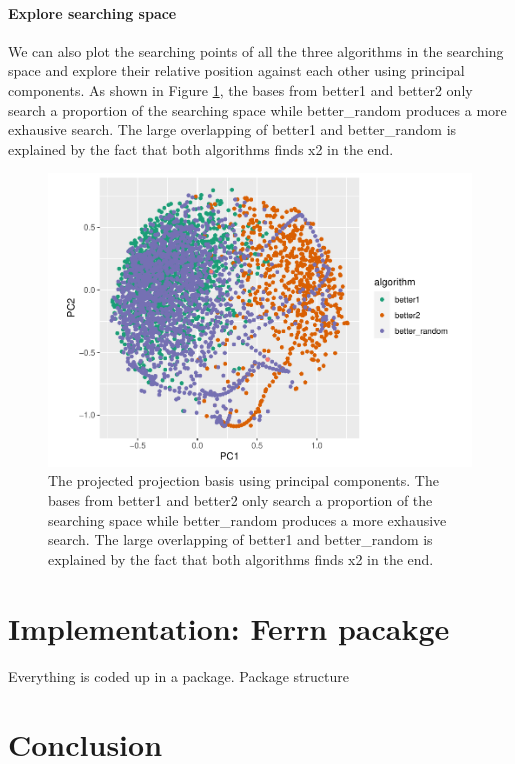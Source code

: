 \documentclass[12pt]{article}
\begin{document}
\hypertarget{explore-searching-space}{%
\paragraph{Explore searching space}\label{explore-searching-space}}

We can also plot the searching points of all the three algorithms in the
searching space and explore their relative position against each other
using principal components. As shown in Figure
\ref{1d-2var-explore-proj-pca}, the bases from better1 and better2 only
search a proportion of the searching space while better\_random produces
a more exhausive search. The large overlapping of better1 and
better\_random is explained by the fact that both algorithms finds x2 in
the end.

\begin{figure}
\centering
\includegraphics{paper_files/figure-latex/1d-2var-explore-proj-pca-1.pdf}
\caption{\label{1d-2var-explore-proj-pca} The projected projection basis
using principal components. The bases from better1 and better2 only
search a proportion of the searching space while better\_random produces
a more exhausive search. The large overlapping of better1 and
better\_random is explained by the fact that both algorithms finds x2 in
the end.}
\end{figure}

\hypertarget{implementation-ferrn-pacakge}{%
\section{Implementation: Ferrn
pacakge}\label{implementation-ferrn-pacakge}}

Everything is coded up in a package. Package structure

\hypertarget{conclusion}{%
\section{Conclusion}\label{conclusion}}

\clearpage



\end{document}
